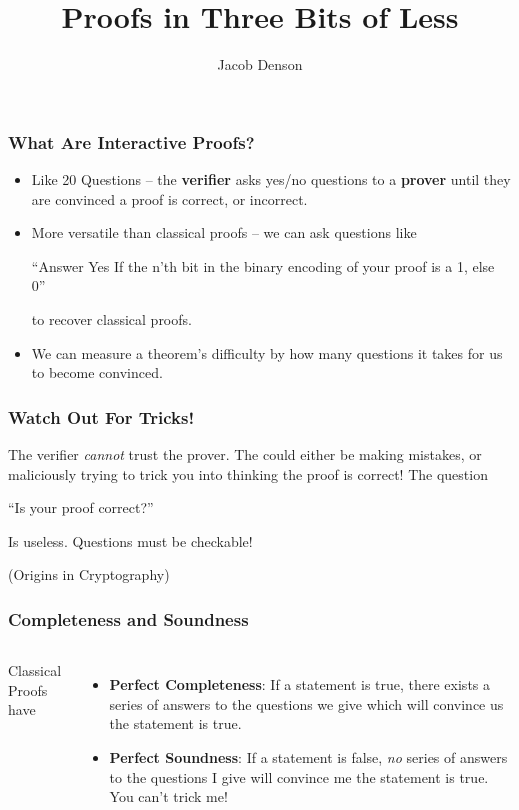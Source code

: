 \documentclass{beamer}
\title{Proofs in Three Bits of Less}
\author{Jacob Denson}
\institute{University of British Columbia}
\begin{document}
\maketitle

\begin{frame}
    \frametitle{What Are Interactive Proofs?}

    \begin{itemize}
        \item<1-> Like 20 Questions -- the {\bf verifier} asks yes/no questions to a {\bf prover} until they are convinced a proof is correct, or incorrect.

        \item<2-> More versatile than classical proofs -- we can ask questions like
        \begin{center} ``Answer Yes If the n'th bit in the binary encoding of your proof is a 1, else 0''
        \end{center}
        to recover classical proofs.

        \item<3-> We can measure a theorem's difficulty by how many questions it takes for us to become convinced.
    \end{itemize}
\end{frame}

\begin{frame}
    \frametitle{Watch Out For Tricks!}

    The verifier {\it cannot} trust the prover. The could either be making mistakes, or maliciously trying to trick you into thinking the proof is correct! The question
    \begin{center} ``Is your proof correct?'' \end{center}
    Is useless. Questions must be checkable!

    (Origins in Cryptography)
\end{frame}

\begin{frame}
    \frametitle{Completeness and Soundness}

    \begin{columns}

    \begin{center} Classical Proofs have \end{center}
    \begin{itemize}
        \item<1-> {\bf Perfect Completeness}: If a statement is true, there exists a series of answers to the questions we give which will convince us the statement is true.

        \item<2-> {\bf Perfect Soundness}: If a statement is false, {\it no} series of answers to the questions I give will convince me the statement is true. You can't trick me!
    \end{itemize}

    \end{columns}
\end{frame}
\end{document}
